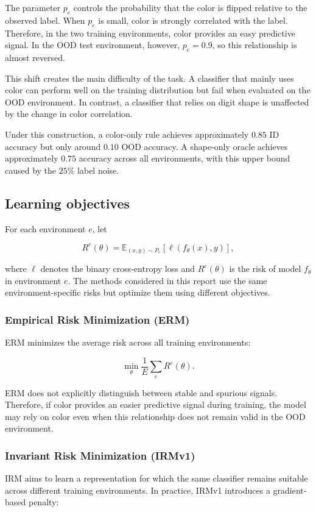\documentclass[12pt,a4paper]{article}
\begin{document}
The parameter $p_e$ controls the probability that the color is flipped relative to
the observed label. When $p_e$ is small, color is strongly correlated with the label.
Therefore, in the two training environments, color provides an easy predictive signal.
In the OOD test environment, however, $p_e=0.9$, so this relationship is almost
reversed.

This shift creates the main difficulty of the task. A classifier that mainly uses
color can perform well on the training distribution but fail when evaluated on the
OOD environment. In contrast, a classifier that relies on digit shape is unaffected
by the change in color correlation.

Under this construction, a color-only rule achieves approximately $0.85$ ID accuracy
but only around $0.10$ OOD accuracy. A shape-only oracle achieves approximately $0.75$
accuracy across all environments, with this upper bound caused by the $25\%$ label noise.

\subsection{Learning objectives}
For each environment $e$, let

\[
R^e(\theta)
=
\mathbb{E}_{(x,y)\sim P_e}
\left[
\ell(f_\theta(x),y)
\right],
\]

where $\ell$ denotes the binary cross-entropy loss and $R^e(\theta)$ is the risk of
model $f_\theta$ in environment $e$. The methods considered in this report use the
same environment-specific risks but optimize them using different objectives.

\subsubsection{Empirical Risk Minimization (ERM)}
ERM minimizes the average risk across all training environments:

\[
\min_\theta
\frac{1}{E}
\sum_e R^e(\theta).
\]

ERM does not explicitly distinguish between stable and spurious signals. Therefore,
if color provides an easier predictive signal during training, the model may rely on
color even when this relationship does not remain valid in the OOD environment.

\subsubsection{Invariant Risk Minimization (IRMv1)}
IRM aims to learn a representation for which the same classifier remains suitable
across different training environments. In practice, IRMv1 introduces a
gradient-based penalty:
\end{document}
